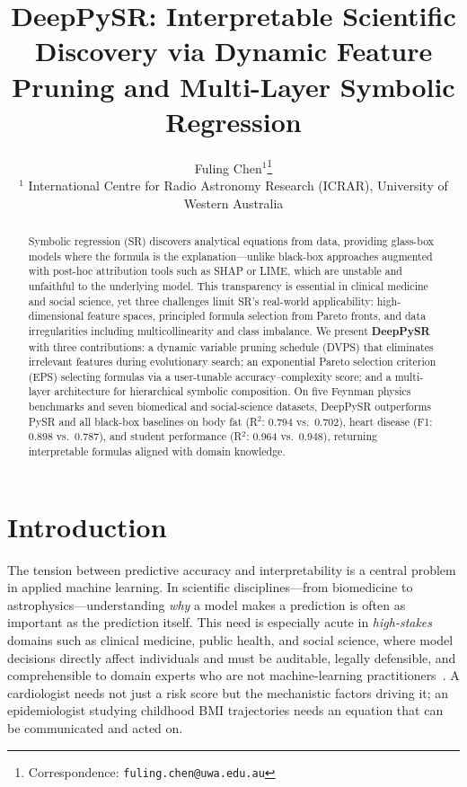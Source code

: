 \documentclass[10pt,twocolumn]{article}
\title{\textbf{DeepPySR: Interpretable Scientific Discovery via Dynamic
Feature Pruning and Multi-Layer Symbolic Regression}}
\author{
  Fuling Chen$^{1}$\thanks{Correspondence: \texttt{fuling.chen@uwa.edu.au}} \\
  $^1$ International Centre for Radio Astronomy Research (ICRAR),
       University of Western Australia
}
\date{}
\begin{document}
\maketitle

\begin{abstract}
Symbolic regression (SR) discovers analytical equations from data, providing
glass-box models where the formula is the explanation—unlike black-box
approaches augmented with post-hoc attribution tools such as SHAP or LIME,
which are unstable and unfaithful to the underlying model.  This transparency
is essential in clinical medicine and social science, yet three challenges
limit SR's real-world applicability: high-dimensional feature spaces, principled
formula selection from Pareto fronts, and data irregularities including
multicollinearity and class imbalance.  We present \textbf{DeepPySR} with
three contributions: a dynamic variable pruning schedule (DVPS) that eliminates
irrelevant features during evolutionary search; an exponential Pareto selection
criterion (EPS) selecting formulas via a user-tunable accuracy–complexity score;
and a multi-layer architecture for hierarchical symbolic composition.  On five
Feynman physics benchmarks and seven biomedical and social-science datasets,
DeepPySR outperforms PySR and all black-box baselines on body fat
(R$^2$: 0.794 vs.\ 0.702), heart disease (F1: 0.898 vs.\ 0.787), and student
performance (R$^2$: 0.964 vs.\ 0.948), returning interpretable formulas
aligned with domain knowledge.
\end{abstract}

\section{Introduction}

The tension between predictive accuracy and interpretability is a central
problem in applied machine learning.  In scientific disciplines—from biomedicine
to astrophysics—understanding \emph{why} a model makes a prediction is often
as important as the prediction itself.  This need is especially acute in
\emph{high-stakes} domains such as clinical medicine, public health, and social
science, where model decisions directly affect individuals and must be auditable,
legally defensible, and comprehensible to domain experts who are not
machine-learning practitioners~\citep{rudin2019stop}.  A cardiologist needs not
just a risk score but the mechanistic factors driving it; an epidemiologist
studying childhood BMI trajectories needs an equation that can be communicated
and acted on.
\end{document}
